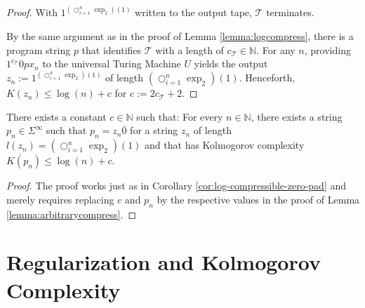 \begin{proof}
	With $1^{\left(\bigcirc_{i=1}^n \exp_2\right)(1)}$ written to the output tape, $\mathcal{T}$ terminates.
	
	By the same argument as in the proof of Lemma \ref{lemma:logcompress}, there is a program string $p$ that identifies $\mathcal{T}$ with a length of $c_{\mathcal{T}}\in\mathbb{N}$.
	For any $n$, providing $1^{c_\mathcal{T}} 0 p x_n$ to the universal Turing Machine $U$ yields the output $z_n:=1^{\left(\bigcirc_{i=1}^n \exp_2\right)(1)}$ of length $\left(\bigcirc_{i=1}^n \exp_2\right)(1)$.
	Henceforth, $K(z_n)\leq \log(n) + c$ for $c:=2c_\mathcal{T}+2$.
	
\end{proof}
\begin{corollary}
	\label{cor:arbitrarycompress-zero-pad}
	There exists a constant $c\in\mathbb{N}$ such that:
	For every $n\in\mathbb{N}$, there exists a string $p_n\in\Sigma^{\infty}$ such that $p_n=z_n\overline{0}$ for a string $z_n$ of length $l(z_n)=\left(\bigcirc_{i=1}^n \exp_2\right)(1)$ and that has Kolmogorov complexity $K(p_n)\leq \log (n) + c$.
\end{corollary}
\begin{proof}
	The proof works just as in Corollary \ref{cor:log-compressible-zero-pad} and merely requires replacing $c$ and $p_n$ by the respective values in the proof of Lemma \ref{lemma:arbitrarycompress}.
\end{proof}

\section{Regularization and Kolmogorov Complexity}

%
%
%
%
%
%
%
%

